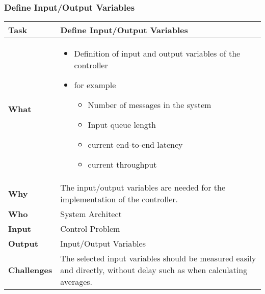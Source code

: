 \subsubsection{Define Input/Output Variables}
\begin{minipage}{\textwidth}
 \label{table:ch6_Task_Define_Controller_Variables}
\begin{tabular}
	{|m{3cm}|m{10cm}|} \hline \bfseries Task & Define Input/Output Variables\\
	\hline \bfseries What &
	\begin{itemize}
		\item Definition of input and output variables of the controller
		\item for example
		\begin{itemize}
			\item Number of messages in the system
			\item Input queue length
			\item current end-to-end latency
			\item current throughput
		\end{itemize}
	\end{itemize}
	\\
	\hline \bfseries Why & The input/output variables are needed for the implementation of the controller.\\
	\hline \bfseries Who & System Architect\\
	\hline \bfseries Input & Control Problem\\
	\hline \bfseries Output & Input/Output Variables\\
	\hline \bfseries Challenges & The selected input variables should be measured easily and directly, without delay such as when calculating averages.\\
	\hline 
\end{tabular}
\end{minipage}

